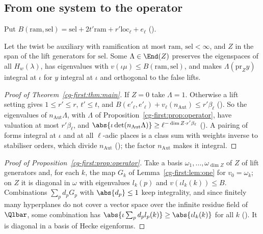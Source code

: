 \subsection{From one system to the operator}\label{cg-first:ss:operator}

Put $B(\mathrm{ram},\mathrm{sel})=\mathrm{sel}+2t'\mathrm{ram}+r'\mathrm{loc}_\ell+e_\ell$
().

\begin{proposition}
\label{cg-first:prop:operator}
Let the twist be auxiliary with ramification at most $\mathrm{ram}$, $\mathrm{sel}<\infty$, and $Z$ in
the span of the lift generators for $\mathrm{sel}$. Some $\Lambda\in\End(Z)$ preserves the eigenspaces
of all $H_w(\lambda)$, has eigenvalues with $v(\iota\mu)\le B(\mathrm{ram},\mathrm{sel})$, and makes
$\Lambda(\mathrm{pr}_Zy)$ integral at $\iota$ for $y$ integral at $\iota$ and orthogonal to the false
lifts.
\end{proposition}

\begin{proof}[Proof of Theorem~\ref{cg-first:thm:main}]
If $Z=0$ take $\Lambda=1$. Otherwise a lift setting gives $1\le r'\le r$, $t'\le t$, and
$B(e'_\ell,e'_\ell)+v_\ell(n_{\mathrm{Aut}})\le r'\beta_\ell$
(). So the eigenvalues of $n_{\mathrm{Aut}}\Lambda$,
with $\Lambda$ of Proposition~\ref{cg-first:prop:operator}, have valuation at most $r'\beta_\ell$, and $\abs{\iota\det(n_{\mathrm{Aut}}\Lambda)}\ge\ell^{-\dim Z\cdot
r'\beta_\ell}$ (). A pairing of forms integral at
$\iota$ and at all $\ell$-adic places is a class sum with weights inverse to stabiliser orders, which
divide $n_{\mathrm{Aut}}$ (); the factor $n_{\mathrm{Aut}}$ makes it
integral.
\end{proof}

\begin{proof}[Proof of Proposition~\ref{cg-first:prop:operator}]
Take a basis $\omega_1,\dots,\omega_{\dim Z}$ of $Z$ of lift generators and, for each $k$, the map $G_k$ of
Lemma~\ref{cg-first:lem:one} for $v_0=\omega_k$; on $Z$ it is diagonal in $\omega$ with eigenvalues $l_k(p)$ and
$v(\iota l_k(k))\le B$. Combinations $\sum_pd_pG_p$ with $\abs{d_p}\le1$ keep integrality, and since
finitely many hyperplanes do not cover a vector space over the infinite residue field of $\Qlbar$,
some combination has $\abs{\iota\sum_pd_pl_p(k)}\ge\abs{\iota l_k(k)}$ for all $k$
(). It is diagonal in a basis of Hecke eigenforms.
\end{proof}

